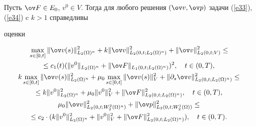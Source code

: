 \begin{cors}\label{s31}


Пусть $\ov F\in E_0$, $v^0\in V$. Тогда для любого решения $(\ov


v,\ov p)$ задачи (\ref{e33}), (\ref{e34}) c $k>1$ справедливы


оценки


\begin{gather}


\maxl {s \in [0,t]} \|\ov


v(s)\|_{L_2(\Om)^n}^2 + k \|\ov


v\|_{L_2(0,t;L_2(\Om)^n)}^2+\|\ov v\|_{L_2(0,t;V)}^2 \le\notag\\


%


\label{e38} 


\le c_1(t)(\| v^0\|_{L_2(\Om)^n}+\|\ov


F\|_{L_1(0,t;L_2(\Om)^n)})^2,\quad t \in (0,T),\\


%


k \maxl {s \in [0,t]}\|\ov


v(s)\|_{L_2(\Om)^n}^2 +\mu_0 \maxl {s \in [0,t]}\|\ov


v(s)\|_V^2+\|\partial_s\ov


v\|_{L_2(0,t;L_2(\Om)^n)}^2 \le\notag \\


%


\label{e39}


\le k\| v^0\|_{L_2(\Om)^n}^2+ \mu_0 \| v^0\|_V^2+\|\ov


F\|_{L_2(0,t;L_2(\Om)^n)}^2,\quad t \in (0,T), \\


%


\mu_0 \|\ov v\|_{L_2(0,t;W_2^2(\Om)^n)}^2


+\|\ov p\|_{L_2(0,t;W_2^1(\Om))}^2 \le\notag \\


%


\label{e310}


\le c_2 \cdot (k\|v^0\|_{L_2(\Om)^n}^2+ \| v^0\|_V^2


+\|\ov F\|_{L_2(0,t;L_2(\Om)^n)}^2 ),\quad t \in (0,T).


\end{gather}


\end{cors}





